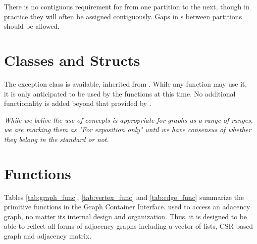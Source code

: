 There is no contiguous requirement for  from one partition to the next, though
in practice they will often be assigned contiguously. Gaps in s between partitions should be allowed.

\section{Classes and Structs}

The  exception class is available, inherited from . While any function may use it, it 
is only anticipated to be used by the  functions at this time.
No additional functionality is added beyond that provided by .

\emph{While we belive the use of concepts is appropriate for graphs as a range-of-ranges, we are marking them as "For exposition only" 
until we have consensus of whether they belong in the standard or not.}

\section{Functions}

Tables \ref{tab:graph_func}, \ref{tab:vertex_func} and \ref{tab:edge_func} summarize the primitive functions in the Graph Container Interface.
used to access an adacency graph, no matter its internal design and organization. Thus, it is designed 
to be able to reflect all forms of adjacency graphs including a vector of lists, CSR-based graph and adjacency matrix.


